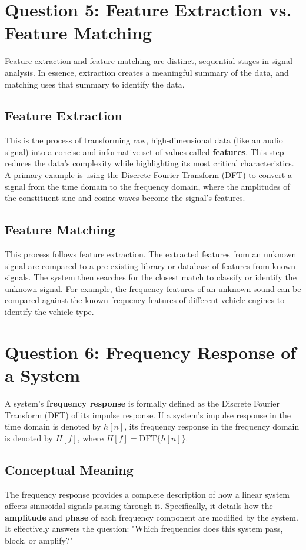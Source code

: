 \documentclass[a4paper,12pt]{article}
\begin{document}
\section{Question 5: Feature Extraction vs. Feature Matching}
Feature extraction and feature matching are distinct, sequential stages in signal analysis. In essence, extraction creates a meaningful summary of the data, and matching uses that summary to identify the data.

\subsection*{Feature Extraction}
This is the process of transforming raw, high-dimensional data (like an audio signal) into a concise and informative set of values called \textbf{features}. This step reduces the data's complexity while highlighting its most critical characteristics. A primary example is using the Discrete Fourier Transform (DFT) to convert a signal from the time domain to the frequency domain, where the amplitudes of the constituent sine and cosine waves become the signal's features.

\subsection*{Feature Matching}
This process follows feature extraction. The extracted features from an unknown signal are compared to a pre-existing library or database of features from known signals. The system then searches for the closest match to classify or identify the unknown signal. For example, the frequency features of an unknown sound can be compared against the known frequency features of different vehicle engines to identify the vehicle type.


\section{Question 6: Frequency Response of a System}
A system's \textbf{frequency response} is formally defined as the Discrete Fourier Transform (DFT) of its impulse response. If a system's impulse response in the time domain is denoted by $h[n]$, its frequency response in the frequency domain is denoted by $H[f]$, where $H[f] = \text{DFT}\{h[n]\}$.

\subsection*{Conceptual Meaning}
The frequency response provides a complete description of how a linear system affects sinusoidal signals passing through it. Specifically, it details how the \textbf{amplitude} and \textbf{phase} of each frequency component are modified by the system. It effectively answers the question: "Which frequencies does this system pass, block, or amplify?"
\end{document}
